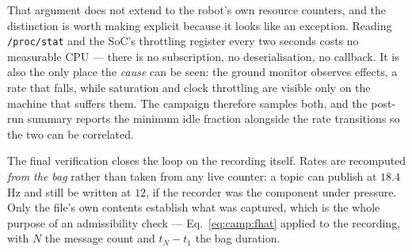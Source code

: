 That argument does not extend to the robot's own resource counters, and the
distinction is worth making explicit because it looks like an exception.
Reading \texttt{/proc/stat} and the SoC's throttling register every two seconds
costs no measurable CPU --- there is no subscription, no deserialisation, no
callback. It is also the only place the \emph{cause} can be seen: the ground
monitor observes effects, a rate that falls, while saturation and clock
throttling are visible only on the machine that suffers them. The campaign
therefore samples both, and the post-run summary reports the minimum idle
fraction alongside the rate transitions so the two can be correlated.

The final verification closes the loop on the recording itself. Rates are
recomputed \emph{from the bag} rather than taken from any live counter: a topic
can publish at $18.4$\,Hz and still be written at $12$, if the recorder was the
component under pressure. Only the file's own contents establish what was
captured, which is the whole purpose of an admissibility check ---
Eq.~\eqref{eq:camp:fhat} applied to the recording, with
$N$ the message count and $t_N - t_1$ the bag duration.
